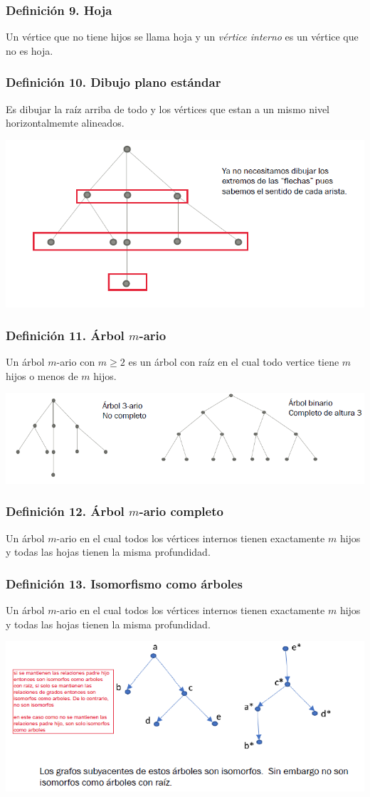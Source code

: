 \documentclass{article}
\begin{document}
\subsubsection*{Definición 9. Hoja}
Un vértice que no tiene hijos se llama hoja y un \emph{vértice interno} es un vértice que no es hoja.


\subsubsection*{Definición 10. Dibujo plano estándar}
Es dibujar la raíz arriba de todo y los vértices que estan a un mismo nivel horizontalmemte alineados.
\begin{center}
    \includegraphics[width=.60\textwidth]{dibujoPlanoEstandar.PNG}
\end{center}

\subsubsection*{Definición 11. Árbol $m$-ario}
Un árbol $m$-ario con $m \geq 2$ es un árbol con raíz en el cual todo vertice tiene $m$ hijos o menos de $m$ hijos.
\begin{center}
    \includegraphics[width=.60\textwidth]{arbolMario.PNG}
\end{center}

\subsubsection*{Definición 12. Árbol $m$-ario completo}
Un árbol $m$-ario en el cual todos los vértices internos tienen exactamente $m$ hijos y todas las hojas tienen la misma profundidad.

\subsubsection*{Definición 13. Isomorfismo como árboles} 
Un árbol $m$-ario en el cual todos los vértices internos tienen exactamente $m$ hijos y todas las hojas tienen la misma profundidad.
\begin{center}
    \includegraphics[width=.60\textwidth]{isomorfismoArboles.PNG}
\end{center}
\end{document}
